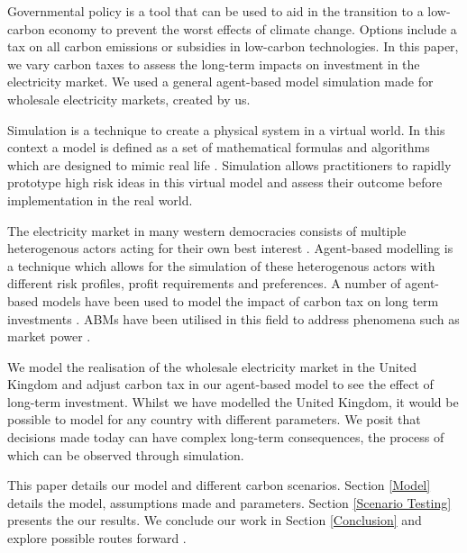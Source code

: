 
Governmental policy is a tool that can be used to aid in the transition to a low-carbon economy to prevent the worst effects of climate change. Options include a tax on all carbon emissions or subsidies in low-carbon technologies. In this paper, we vary carbon taxes to assess the long-term impacts on investment in the electricity market. We used a general agent-based model simulation made for wholesale electricity markets, created by us. 


Simulation is a technique to create a physical system in a virtual world.  In this context a model is defined as a set of mathematical formulas and algorithms which are designed to mimic real life \cite{Forshaw2016}. Simulation allows practitioners to rapidly prototype high risk ideas in this virtual model and assess their outcome before implementation in the real world.

The electricity market in many western democracies consists of multiple heterogenous actors acting for their own best interest \cite{Most2010}. Agent-based modelling is a technique which allows for the simulation of these heterogenous actors with different risk profiles, profit requirements and preferences. A number of agent-based models have been used to model the impact of carbon tax on long term investments \cite{Tang2015, Chen2014, Chappin2017}. ABMs have been utilised in this field to address phenomena such as market power \cite{Ringler2016a}.

We model the realisation of the wholesale electricity market in the United Kingdom and adjust carbon tax in our agent-based model to see the effect of long-term investment. Whilst we have modelled the United Kingdom, it would be possible to model for any country with different parameters. We posit that decisions made today can have complex long-term consequences, the process of which can be observed through simulation.



This paper details our model and different carbon scenarios. Section \ref{Model} details the model, assumptions made and parameters. Section \ref{Scenario Testing} presents the our results. We conclude our work in Section \ref{Conclusion} and explore possible routes forward .


